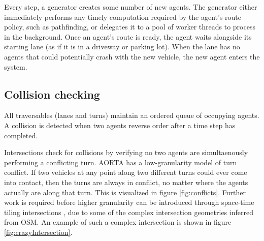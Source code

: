 \documentclass[letterpaper, 10 pt, conference]{ieeeconf}  %
\begin{document}
Every step, a generator creates some number of new agents. The generator either
immediately performs any timely computation required by the agent's route
policy, such as pathfinding, or delegates it to a pool of worker threads to
process in the background.  Once an agent's route is ready, the agent waits
alongside its starting lane (as if it is in a driveway or parking lot). When the
lane has no agents that could potentially crash with the new vehicle, the new
agent enters the system.

\subsection{Collision checking}

All traversables (lanes and turns) maintain an ordered queue of occupying
agents. A collision is detected when two agents reverse order after a time step
has completed.

Intersections check for collisions by verifying no two agents are simultaenously
performing a conflicting turn. AORTA has a low-granularity model of turn
conflict. If two vehicles at any point along two different turns could ever come
into contact, then the turns are always in conflict, no matter where the agents
actually are along that turn. This is visualized in figure \ref{fig:conflicts}.
Further work is required before higher granularity can be introduced through
space-time tiling intersections \cite{JAIR08-dresner}, due to some of the
complex intersection geometries inferred from OSM. An example of such a complex
intersection is shown in figure \ref{fig:crazyIntersection}.

\end{document}
